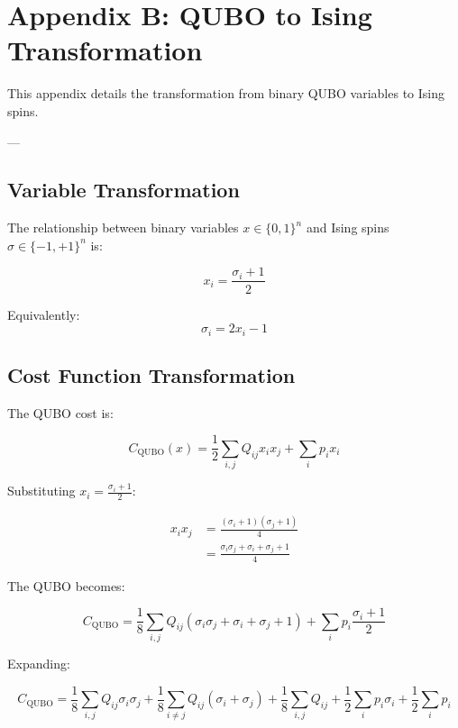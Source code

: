 \chapter*{Appendix B: QUBO to Ising Transformation}

This appendix details the transformation from binary QUBO variables to Ising spins.

---

\section{Variable Transformation}

The relationship between binary variables $x \in \{0, 1\}^n$ and Ising spins $\sigma \in \{-1, +1\}^n$ is:

\begin{equation}\label{eq:binary-to-ising}
x_i = \frac{\sigma_i + 1}{2}
\end{equation}

Equivalently:
\begin{equation}\label{eq:ising-to-binary}
\sigma_i = 2x_i - 1
\end{equation}

\section{Cost Function Transformation}

The QUBO cost is:

\begin{equation}
C_{\text{QUBO}}(x) = \frac{1}{2} \sum_{i,j} Q_{ij} x_i x_j + \sum_i p_i x_i
\end{equation}

Substituting $x_i = \frac{\sigma_i + 1}{2}$:

\begin{align}
x_i x_j &= \frac{(\sigma_i + 1)(\sigma_j + 1)}{4} \\
&= \frac{\sigma_i \sigma_j + \sigma_i + \sigma_j + 1}{4}
\end{align}

The QUBO becomes:

\begin{equation}
C_{\text{QUBO}} = \frac{1}{8} \sum_{i,j} Q_{ij} (\sigma_i \sigma_j + \sigma_i + \sigma_j + 1) + \sum_i p_i \frac{\sigma_i + 1}{2}
\end{equation}

Expanding:

\begin{equation}
C_{\text{QUBO}} = \frac{1}{8} \sum_{i,j} Q_{ij} \sigma_i \sigma_j + \frac{1}{8} \sum_{i \neq j} Q_{ij} (\sigma_i + \sigma_j) + \frac{1}{8} \sum_{i,j} Q_{ij} + \frac{1}{2} \sum_i p_i \sigma_i + \frac{1}{2} \sum_i p_i
\end{equation}

